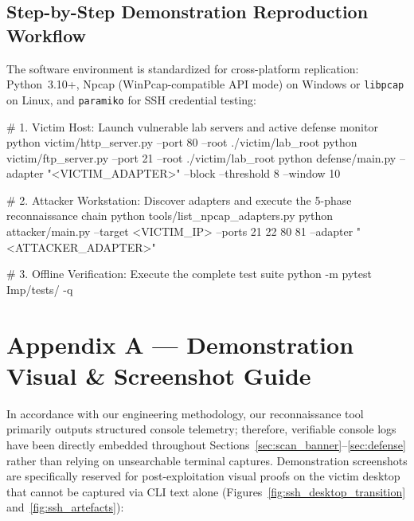 \subsection{Step-by-Step Demonstration Reproduction Workflow}
The software environment is standardized for cross-platform replication: Python~3.10+, Npcap
(WinPcap-compatible API mode) on Windows or \texttt{libpcap} on Linux, and \texttt{paramiko} for SSH
credential testing:

\begin{logbox}
# 1. Victim Host: Launch vulnerable lab servers and active defense monitor
python victim/http_server.py --port 80 --root ./victim/lab_root
python victim/ftp_server.py  --port 21 --root ./victim/lab_root
python defense/main.py --adapter "<VICTIM_ADAPTER>" --block --threshold 8 --window 10

# 2. Attacker Workstation: Discover adapters and execute the 5-phase reconnaissance chain
python tools/list_npcap_adapters.py
python attacker/main.py --target <VICTIM_IP> --ports 21 22 80 81 --adapter "<ATTACKER_ADAPTER>"

# 3. Offline Verification: Execute the complete test suite
python -m pytest Imp/tests/ -q
\end{logbox}

\section*{\sffamily\color{accent}Appendix A — Demonstration Visual \& Screenshot Guide}

In accordance with our engineering methodology, our reconnaissance tool primarily outputs structured
console telemetry; therefore, verifiable console logs have been directly embedded throughout
Sections~\ref{sec:scan_banner}--\ref{sec:defense} rather than relying on unsearchable terminal captures.
Demonstration screenshots are specifically reserved for post-exploitation visual proofs on the victim
desktop that cannot be captured via CLI text alone (Figures~\ref{fig:ssh_desktop_transition} and~\ref{fig:ssh_artefacts}):

